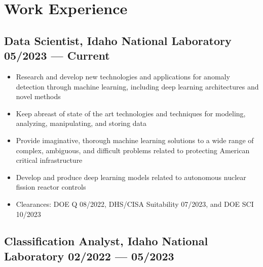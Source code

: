 \documentclass[letterpaper,11pt]{article}
\begin{document}
\section{\color{cvblue}Work Experience } %

\subsection*{{\color{cvblue}Data Scientist, Idaho National Laboratory } \hfill 05/2023 — Current} 
\begin{itemize}
    \setlength{\itemsep}{-.5pt}
\item  Research and develop new technologies and applications for anomaly detection through machine learning, including deep learning architectures and novel methods
\item  Keep abreast of state of the art technologies and techniques for modeling, analyzing, manipulating, and storing data
\item  Provide imaginative, thorough machine learning solutions to a wide range of complex, ambiguous, and difficult problems related to protecting American critical infrastructure
\item  Develop and produce deep learning models related to autonomous nuclear fission reactor controls
\item  Clearances: DOE Q 08/2022, DHS/CISA Suitability 07/2023, and DOE SCI 10/2023
\end{itemize}


\subsection*{{\color{cvblue}Classification Analyst, Idaho National Laboratory } \hfill 02/2022 — 05/2023} 
 
\end{document}
